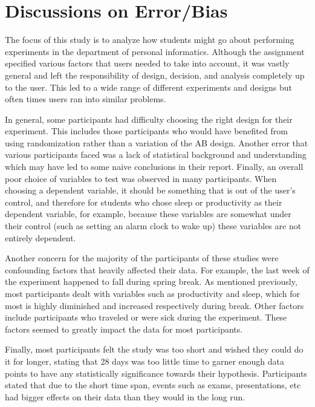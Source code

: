 \section{Discussions on Error/Bias}

The focus of this study is to analyze how students might go about performing experiments in the department of personal informatics. Although the assignment specified various factors that users needed to take into account, it was vastly general and left the responsibility of design, decision, and analysis completely up to the user. This led to a wide range of different experiments and designs but often times users ran into similar problems.

In general, some participants had difficulty choosing the right design for their experiment. This includes those participants who would have benefited from using randomization rather than a variation of the AB design. Another error that various participants faced was a lack of statistical background and understanding which may have led to some naive conclusions in their report. Finally, an overall poor choice of variables to test was observed in many participants. When choosing a dependent variable, it should be something that is out of the user’s control, and therefore for students who chose sleep or productivity as their dependent variable, for example, because these variables are somewhat under their control (such as setting an alarm clock to wake up) these variables are not entirely dependent.  

Another concern for the majority of the participants of these studies were confounding factors that heavily affected their data. For example, the last week of the experiment happened to fall during spring break. As mentioned previously, most participants dealt with variables such as productivity and sleep, which for most is highly diminished and increased respectively during break. Other factors include participants who traveled or were sick during the experiment. These factors seemed to greatly impact the data for most participants.

Finally, most participants felt the study was too short and wished they could do it for longer, stating that 28 days was too little time to garner enough data points to have any statistically significance towards their hypothesis. Participants stated that due to the short time span, events such as exams, presentations, etc had bigger effects on their data than they would in the long run. 

